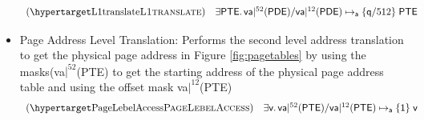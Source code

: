 \begin{itemize}
\[\begin{array}{l}
      \hbox{(\TirNameStyle{{L1translate}})} \quad
      \exists \entryo \ldotp \nfpointsto{\mask\vaddr\ft\entrytw}{\mask\vaddr\tw\entrytw}\entryo\qfracfot\naddr
      \end{array}
      \]
  \item Page Address Level Translation: Performs the second level address translation to get the physical page address in Figure \ref{fig:pagetables} by using the masks(\textsf{va}$|^{52}$(\textsf{PTE}) to get the starting address of the physical page address table and using the offset mask \textsf{va}$|^{12}$(\textsf{PTE})
    \[ \begin{array}{l}
      \hbox{(\TirNameStyle{{PageLebelAccess}})} \quad
      \exists \vpage \ldotp \nfpointsto{\mask\vaddr\ft\entryo}{\mask\vaddr\tw\entryo}\vpage\qfracone\naddr
      \end{array}
      \]
    
\end{itemize}
